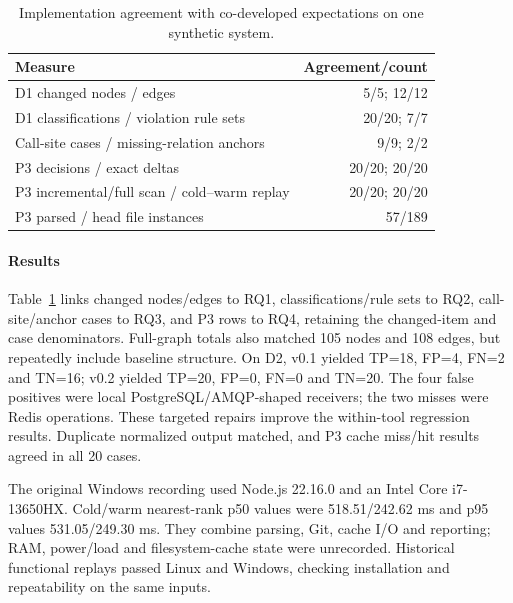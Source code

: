 \begin{table}[t]
\caption{Implementation agreement with co-developed expectations on one synthetic system.}
\label{tab:historic}
\centering
\begin{tabular}{@{}>{\raggedright\arraybackslash}p{.67\linewidth}r@{}}
\toprule
Measure & Agreement/count\\\midrule
D1 changed nodes / edges & 5/5; 12/12\\
D1 classifications / violation rule sets & 20/20; 7/7\\
Call-site cases / missing-relation anchors & 9/9; 2/2\\
P3 decisions / exact deltas & 20/20; 20/20\\
P3 incremental/full scan / cold--warm replay & 20/20; 20/20\\
P3 parsed / head file instances & 57/189\\\bottomrule
\end{tabular}
\end{table}

\paragraph{Results} Table~\ref{tab:historic} links changed nodes/edges to RQ1, classifications/rule sets to RQ2, call-site/anchor cases to RQ3, and P3 rows to RQ4, retaining the changed-item and case denominators. Full-graph totals also matched 105 nodes and 108 edges, but repeatedly include baseline structure. On D2, v0.1 yielded TP=18, FP=4, FN=2 and TN=16; v0.2 yielded TP=20, FP=0, FN=0 and TN=20. The four false positives were local PostgreSQL/AMQP-shaped receivers; the two misses were Redis operations. These targeted repairs improve the within-tool regression results. Duplicate normalized output matched, and P3 cache miss/hit results agreed in all 20 cases.

\begin{sloppypar}
The original Windows recording used Node.js 22.16.0 and an Intel Core i7-13650HX. Cold/warm nearest-rank p50 values were 518.51/242.62 ms and p95 values 531.05/249.30 ms. They combine parsing, Git, cache I/O and reporting; RAM, power/load and filesystem-cache state were unrecorded. Historical functional replays passed Linux and Windows, checking installation and repeatability on the same inputs.
\end{sloppypar}

